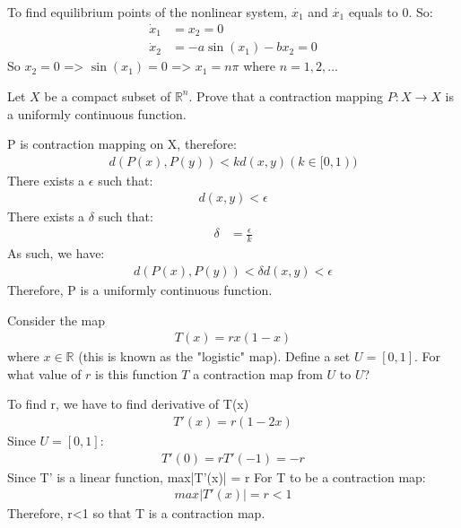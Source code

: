 \begin{answer}
    To find equilibrium points of the nonlinear system, $\dot{x_1}$ and $\dot{x_1}$ equals to 0.
    So:
    \begin{align*}
        \dot{x}_1 &= x_2 = 0 \\
        \dot{x}_2 & = -a \sin{(x_1)} - bx_2 = 0
    \end{align*}
    So $x_2=0$ => $\sin{(x_1)} = 0$ => $x_1=n \pi$ where $n = 1,2,...$
\end{answer}

\begin{problem}[15]
    Let $X$ be a compact subset of $\mathbb{R}^n$. Prove that a contraction mapping $P: X \rightarrow X$ is a uniformly continuous function.
\end{problem}

\begin{answer}
    P is contraction mapping on X, therefore:
    \begin{align*}
    		d(P(x),P(y))<kd(x,y)(k \in [0,1))
    \end{align*}
    There exists a $\epsilon$ such that:
    \begin{align*}
    		d(x,y)<\epsilon
    \end{align*}
    There exists a $\delta$ such that:
    \begin{align*}
    		\delta &= \frac{\epsilon}{k}
    \end{align*}
    As such, we have:
    \begin{align*}
    		d(P(x),P(y))<\delta
    		d(x,y)<\epsilon
    \end{align*}
    Therefore, P is a uniformly continuous function.
\end{answer}

\begin{problem}[15]
    Consider the map
    \begin{align*}
        T(x) = rx(1-x)
    \end{align*}
    where $x \in \mathbb{R}$ (this is known as the "logistic" map). Define a set $U=[0,1]$. For what value of $r$ is this function $T$ a contraction map from $U$ to $U$?
\end{problem}

\begin{answer}
    To find r, we have to find derivative of T(x)
    \begin{align*}
    		T'(x)=r(1-2x)    		
    \end{align*}
    Since $U= [0,1]$:
    \begin{align*}
    		T'(0)=r
    		T'(-1)=-r
    \end{align*}
    Since T' is a linear function, max|T'(x)| = r
    For T to be a contraction map:
    \begin{align*}
    max|T'(x)| = r<1
    \end{align*}
    Therefore, r<1 so that T is a contraction map.
\end{answer}

